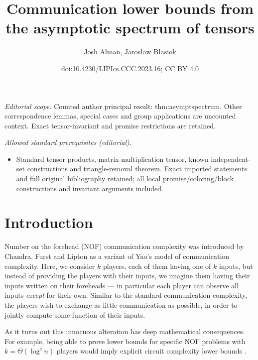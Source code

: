 \documentclass[10pt,a4paper]{article}
\title{Communication lower bounds from the asymptotic spectrum of tensors}
\author{Josh Alman, Jarosław Błasiok}
\date{doi:10.4230/LIPIcs.CCC.2023.16; CC BY 4.0}
\newcommand{\jnote}[1]{\todo[inline, color=blue!30!white]{#1 \\ -\textsc{Jarek}}}
\newcommand{\joshnote}[1]{\todo[inline, color=red!30!white]{#1 \\ -\textsc{Josh}}}
\begin{document}
\maketitle
\noindent\textit{Editorial scope.} Counted author principal result: thm:asymptspectrum. Other correspondence lemmas, special cases and group applications are uncounted context. Exact tensor-invariant and promise restrictions are retained.\par\medskip
\noindent\textit{Allowed standard prerequisites (editorial).}\begin{itemize}
\item Standard tensor products, matrix-multiplication tensor, known independent-set constructions and triangle-removal theorem. Exact imported statements and full original bibliography retained; all local promise/coloring/block constructions and invariant arguments included.
\end{itemize}\medskip
\section{Introduction}


Number on the forehead (NOF) communication complexity was introduced by Chandra, Furst and Lipton \cite{CFL83} as a variant of Yao's model of communication complexity. Here, we consider $k$ players, each of them having one of $k$ inputs, but instead of providing the players with their inputs, we imagine them having their inputs written on their foreheads --- in particular each player can observe all inputs \emph{except} for their own. Similar to the standard communication complexity, the players wish to exchange as little communication as possible, in order to jointly compute some function of their inputs.

As it turns out this innocuous alteration has deep mathematical consequences. For example, being able to prove lower bounds for specific NOF problems with $k = \Theta(\log^c n)$ players would imply explicit circuit complexity lower bounds \cite{HG90,BT94}.
\end{document}
